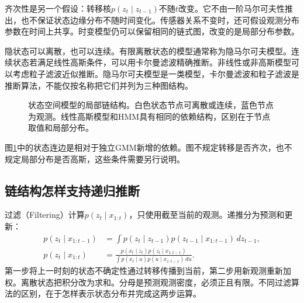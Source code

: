 齐次性是另一个假设：转移核$p(z_t\mid z_{t-1})$不随$t$改变。它不由一阶马尔可夫性推出，也不保证状态边缘分布不随时间变化。传感器关系不变时，还可假设观测分布参数在时间上共享。时变模型仍可以保留相同的链式图，改变的是局部分布参数。

隐状态可以离散，也可以连续。有限离散状态的模型通常称为隐马尔可夫模型。连续状态若满足线性高斯条件，可以用卡尔曼滤波精确推断。非线性或非高斯模型可以考虑粒子滤波近似推断。隐马尔可夫模型是一类模型，卡尔曼滤波和粒子滤波是推断算法，不能仅按名称把它们并列为三种图结构。

\begin{figure}[htbp]
\centering
{}
\caption{状态空间模型的局部链结构。白色状态节点可离散或连续，蓝色节点为观测。线性高斯模型和HMM具有相同的依赖结构，区别在于节点取值和局部分布。}
\label{fig:bayes-ssm-structure}
\end{figure}

图\ref{fig:bayes-ssm-structure}中的状态连边是相对于独立GMM新增的依赖。图不规定转移是否齐次，也不规定局部分布是否高斯，这些条件需要另行说明。

\subsection{链结构怎样支持递归推断}
过滤（Filtering）计算$p(z_t\mid x_{1:t})$，只使用截至当前的观测。递推分为预测和更新：
\begin{align}
 p(z_t\mid x_{1:t-1})
 &=\int p(z_t\mid z_{t-1})p(z_{t-1}\mid x_{1:t-1})\,dz_{t-1},\\
 p(z_t\mid x_{1:t})
 &=\frac{p(x_t\mid z_t)p(z_t\mid x_{1:t-1})}
 {\int p(x_t\mid u)p(u\mid x_{1:t-1})\,du}.
 \label{eq:bayes-filter-recursion}
\end{align}
第一步将上一时刻的状态不确定性通过转移传播到当前，第二步用新观测重新加权。离散状态把积分改为求和。分母是预测观测密度，必须正且有限。不同过滤算法的区别，在于怎样表示状态分布并完成这两步运算。

